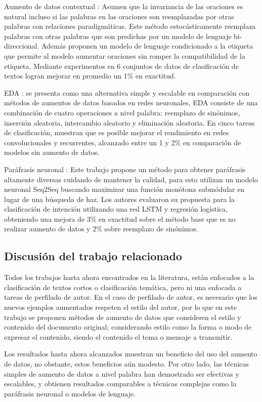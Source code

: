 Aumento de datos contextual \cite{kobayashi2018contextual}: Asumen que la invariancia de las oraciones es natural incluso si las palabras en las oraciones son reemplazadas por otras palabras con relaciones paradigmáticas. Este método estocásticamente reemplaza palabras con otras palabras que son predichas por un modelo de lenguaje bi-direccional. Además proponen un modelo de lenguaje condicionado a la etiqueta que permite al modelo aumentar oraciones sin romper la compatibilidad de la etiqueta. Mediante experimentos en 6 conjuntos de datos de clasificación de textos logran mejorar en promedio un 1\% en exactitud.

EDA \cite{wei2019eda}: se presenta como una alternativa simple y escalable en comparación con métodos de aumentos de datos basados en redes neuronales, EDA consiste de una combinación de cuatro operaciones a nivel palabra: reemplazo de sinónimos, inserción aleatoria, intercambio aleatorio y eliminación aleatoria. En cinco tareas de clasificación, muestran que es posible mejorar  el rendimiento en redes convolucionales y recurrentes, alcanzado entre un 1 y 2\% en comparación de modelos sin aumento de datos.

Paráfrasis neuronal \cite{kumar2019submodular}: Este trabajo propone un método para obtener paráfrasis altamente diversas cuidando de mantener la calidad, para esto utilizan un modelo neuronal Seq2Seq buscando maximizar una función monótona submódular en lugar de una búsqueda de haz. Los autores evaluaron su propuesta para la clasificación de intención utilizando una red LSTM y regresión logística, obteniendo una mejora de 3\% en exactitud sobre el método base que es no realizar aumento de datos y 2\% sobre reemplazo de sinónimos.

\subsection{Discusión del trabajo relacionado}

Todos los trabajos hasta ahora encontrados en la literatura, están enfocados a la clasificación de textos cortos o clasificación temática,  pero ni una enfocada a tareas de perfilado de autor. En el caso de perfilado de autor, es necesario que los nuevos ejemplos aumentados respeten el estilo del autor, por lo que en este trabajo se proponen métodos de aumento de datos que consideren el estilo y contenido del documento original; considerando estilo como la forma o modo de expresar el contenido, siendo el contenido el tema o mensaje a transmitir.

Los resultados hasta ahora alcanzados muestran un beneficio del uso del aumento de datos, no obstante, estos beneficios aún modesto. Por otro lado, las técnicas simples de aumento de datos a nivel palabra han demostrado ser efectivas y escalables, y obtienen resultados comparables a técnicas complejas como  la paráfrasis neuronal o modelos de lenguaje.

